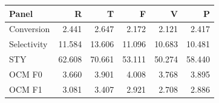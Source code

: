 \begin{tabular}{lrrrrr}\toprule Panel & R & T & F & V & P\\\midrule
Conversion & 2.441 & 2.647 & 2.172 & 2.121 & 2.417\\
Selectivity & 11.584 & 13.606 & 11.096 & 10.683 & 10.481\\
STY & 62.608 & 70.661 & 53.111 & 50.274 & 58.440\\
OCM F0 & 3.660 & 3.901 & 4.008 & 3.768 & 3.895\\
OCM F1 & 3.081 & 3.407 & 2.921 & 2.708 & 2.886\\
\bottomrule\end{tabular}
